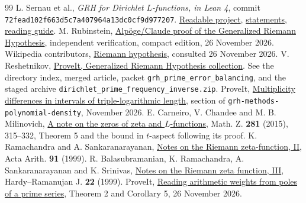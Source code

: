 \documentclass[11pt]{article}
\begin{document}
\begin{thebibliography}{99}\small
{} L. Sernau et al., \emph{GRH for Dirichlet $L$-functions, in Lean 4},
commit \texttt{72fead102f663d5c7a407964a13dc0cf9d977207}.
\href{https://github.com/lsernau/grh-lean/tree/72fead102f663d5c7a407964a13dc0cf9d977207/grh}{Readable project},
\href{https://github.com/lsernau/grh-lean/blob/72fead102f663d5c7a407964a13dc0cf9d977207/grh/src/Statements.lean}{statements},
\href{https://github.com/lsernau/grh-lean/blob/72fead102f663d5c7a407964a13dc0cf9d977207/grh/GUIDE.md}{reading guide}.
 M. Rubinstein, \href{https://www.math.uwaterloo.ca/~mrubinst/alpoge_claude_grh/}{Alp\"oge/Claude proof of the Generalized Riemann Hypothesis}, independent verification, compact edition, 26 November 2026.
 Wikipedia contributors, \href{https://en.wikipedia.org/wiki/Riemann_hypothesis}{Riemann hypothesis}, consulted 26 November 2026.
 V. Reshetnikov, \href{https://github.com/VladimirReshetnikov/ProveIt/tree/b29490a150d3947b114d6c9daf3398300537eb64/Analysis/GeneralizedRiemannHypothesis}{ProveIt, Generalized Riemann Hypothesis collection}.
See the directory index, merged article, packet
\texttt{grh\_prime\_error\_balancing}, and the staged archive
\texttt{dirichlet\_prime\_frequency\_inverse.zip}.
 ProveIt, \href{https://github.com/VladimirReshetnikov/ProveIt/blob/b29490a150d3947b114d6c9daf3398300537eb64/Analysis/GeneralizedRiemannHypothesis/Research/grh-methods-polynomial-density/short.tex}{Multiplicity differences in intervals of triple-logarithmic length}, section of \texttt{grh-methods-polynomial-density}, November 2026.
 E. Carneiro, V. Chandee and M. B. Milinovich, \href{https://arxiv.org/abs/1503.00955}{A note on the zeros of zeta and $L$-functions}, Math. Z. \textbf{281} (2015), 315--332, Theorem 5 and the bound in $t$-aspect following its proof.
 K. Ramachandra and A. Sankaranarayanan, \href{https://matwbn.icm.edu.pl/ksiazki/aa/aa91/aa9145.pdf}{Notes on the Riemann zeta-function, II}, Acta Arith. \textbf{91} (1999).
 R. Balasubramanian, K. Ramachandra, A. Sankaranarayanan and K. Srinivas, \href{https://hrj.episciences.org/139}{Notes on the Riemann zeta function, III}, Hardy--Ramanujan J. \textbf{22} (1999).
 ProveIt, \href{https://github.com/VladimirReshetnikov/ProveIt/blob/b29490a150d3947b114d6c9daf3398300537eb64/Analysis/GeneralizedRiemannHypothesis/Research/prime_pole_windows/prime_pole_windows.tex}{Reading arithmetic weights from poles of a prime series}, Theorem 2 and Corollary 5, 26 November 2026.

\end{thebibliography}
\end{document}
